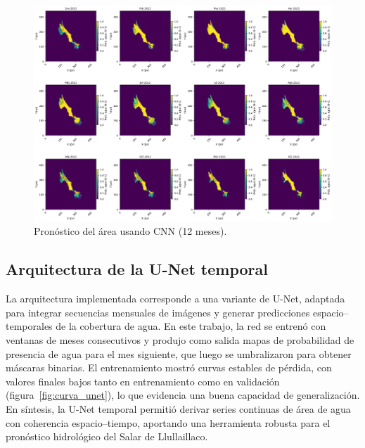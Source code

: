 \begin{figure}[H]
    \centering
    \includegraphics[scale=0.30]{Figures/forecast_cnn.png}
    \caption{Pronóstico del área usando CNN (12 meses).}
    \label{fig:forecast_cnn1}
\end{figure}

\subsection{Arquitectura de la U-Net temporal}

La arquitectura implementada corresponde a una variante de U-Net, adaptada para integrar secuencias mensuales de imágenes y generar predicciones espacio–temporales de la cobertura de agua. En este trabajo, la red se entrenó con ventanas de meses consecutivos y produjo como salida mapas de probabilidad de presencia de agua para el mes siguiente, que luego se umbralizaron para obtener máscaras binarias. El entrenamiento mostró curvas estables de pérdida, con valores finales bajos tanto en entrenamiento como en validación (figura~\ref{fig:curva_unet}), lo que evidencia una buena capacidad de generalización. En síntesis, la U-Net temporal permitió derivar series continuas de área de agua con coherencia espacio–tiempo, aportando una herramienta robusta para el pronóstico hidrológico del Salar de Llullaillaco.

